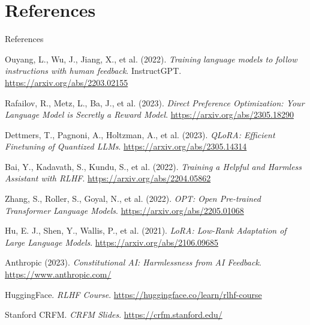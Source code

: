 \section*{References}
\begin{frame}[allowframebreaks]{References}
    \scriptsize
    \begin{thebibliography}{99}
        Ouyang, L., Wu, J., Jiang, X., et al. (2022). \emph{Training language models to follow instructions with human feedback}. InstructGPT. \url{https://arxiv.org/abs/2203.02155}

        Rafailov, R., Metz, L., Ba, J., et al. (2023). \emph{Direct Preference Optimization: Your Language Model is Secretly a Reward Model}. \url{https://arxiv.org/abs/2305.18290}

        Dettmers, T., Pagnoni, A., Holtzman, A., et al. (2023). \emph{QLoRA: Efficient Finetuning of Quantized LLMs}. \url{https://arxiv.org/abs/2305.14314}

        Bai, Y., Kadavath, S., Kundu, S., et al. (2022). \emph{Training a Helpful and Harmless Assistant with RLHF}. \url{https://arxiv.org/abs/2204.05862}

        Zhang, S., Roller, S., Goyal, N., et al. (2022). \emph{OPT: Open Pre-trained Transformer Language Models}. \url{https://arxiv.org/abs/2205.01068}

        Hu, E. J., Shen, Y., Wallis, P., et al. (2021). \emph{LoRA: Low-Rank Adaptation of Large Language Models}. \url{https://arxiv.org/abs/2106.09685}

        Anthropic (2023). \emph{Constitutional AI: Harmlessness from AI Feedback}. \url{https://www.anthropic.com/}

        HuggingFace. \emph{RLHF Course}. \url{https://huggingface.co/learn/rlhf-course}

        Stanford CRFM. \emph{CRFM Slides}. \url{https://crfm.stanford.edu/}
    \end{thebibliography}
\end{frame}